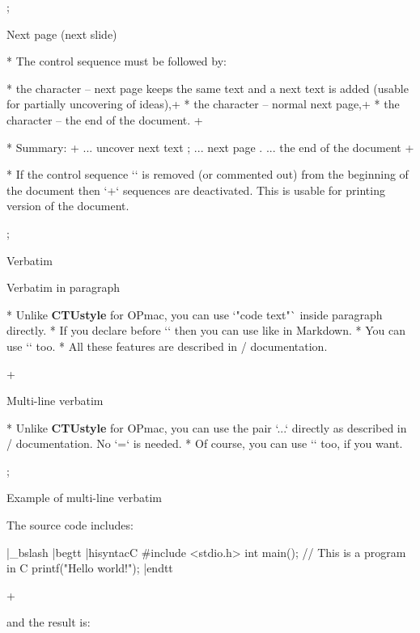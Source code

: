 \pg; %

\sec Next page (next slide)

* The control sequence \code{\\pg} must be followed by:

\begitems
* the character \frame{\strut\code{+}} -- next page keeps the same text
  and a next text is added (usable for partially uncovering of ideas),\pg+ 
* the character \frame{\strut\code{;}} -- normal next page,\pg+
* the character  -- the end of the document.
\enditems
\pg+

* Summary:
\begtt
\pg+    ... uncover next text
\pg;    ... next page
\pg.    ... the end of the document
\endtt
\pg+

* If the control sequence `\slideshow` is removed (or commented out)
  from the beginning of the document then `\pg+` sequences are deactivated.
  This is usable for printing version of the document.

\pg; %

\sec Verbatim

\secc Verbatim in paragraph

* Unlike {\Blue\bf CTUstyle} for OPmac, you can use 
  `"code text"` inside paragraph directly.
* If you declare  before `\slides` then you can use
   like in Markdown. 
* You can use `` too.
* All these features are described in \OpTeX/ documentation. 

\pg+

\secc Multi-line verbatim

* Unlike {\Blue\bf CTUstyle} for OPmac, you can use the pair
  `\begtt...\endtt` directly as described in \OpTeX/ documentation.
  No `\pg=` is needed.
* Of course, you can use `\verbinut` too, if you want.

\pg; %

\sec Example of multi-line verbatim

The source code includes:

\begtt \adef|{\_bslash}
|begtt |hisyntac{C}
#include <stdio.h>
int main(); // This is a program in C
{
  printf("Hello world!\n");
}
|endtt
\endtt

\pg+

and the result is:

